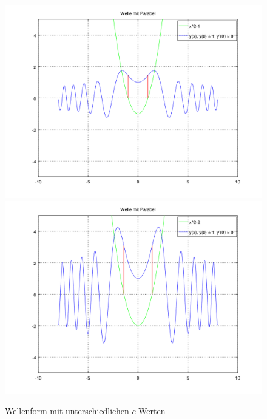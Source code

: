 \begin{figure}
	\includegraphics[scale=0.35]{./wellen/images/varc/cneg1.png}
	\includegraphics[scale=0.35]{./wellen/images/varc/cneg2.png}
	\caption{Wellenform mit unterschiedlichen $c$ Werten}
	\label{fig:wellen:variablec}
\end{figure}

